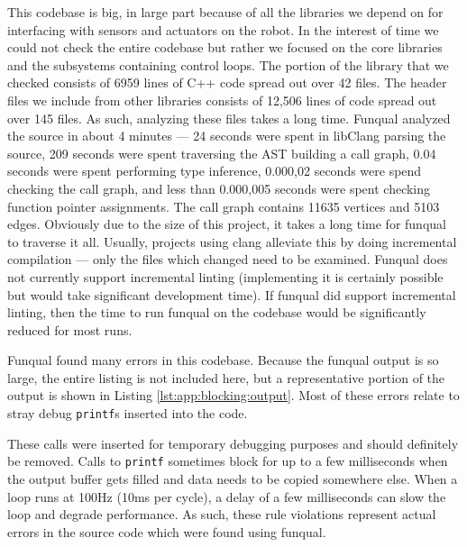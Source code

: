 This codebase is big, in large part because of all the libraries we depend on for interfacing with sensors and actuators on the robot.  In the interest of time we could not check the entire codebase but rather we focused on the core libraries and the subsystems containing control loops.  The portion of the library that we checked consists of 6959 lines of C++ code spread out over 42 files.  The header files we include from other libraries consists of 12,506 lines of code spread out over 145 files.  As such, analyzing these files takes a long time.  Funqual analyzed the source in about 4 minutes --- 24 seconds were spent in libClang parsing the source, 209 seconds were spent traversing the AST building a call graph, 0.04 seconds were spent performing type inference, 0.000,02 seconds were spend checking the call graph, and less than 0.000,005 seconds were spent checking function pointer assignments.  The call graph contains 11635 vertices and 5103 edges.  Obviously due to the size of this project, it takes a long time for funqual to traverse it all.  Usually, projects using clang alleviate this by doing incremental compilation --- only the files which changed need to be examined.  Funqual does not currently support incremental linting (implementing it is certainly possible but would take significant development time).  If funqual did support incremental linting, then the time to run funqual on the codebase would be significantly reduced for most runs.  

Funqual found many errors in this codebase.  Because the funqual output is so large, the entire listing is not included here, but a representative portion of the output is shown in Listing \ref{lst:app:blocking:output}.  Most of these errors relate to stray debug \lstinline{printf}s inserted into the code.  

These calls were inserted for temporary debugging purposes and should definitely be removed.  Calls to \lstinline{printf} sometimes block for up to a few milliseconds when the output buffer gets filled and data needs to be copied somewhere else.  When a loop runs at 100Hz (10ms per cycle), a delay of a few milliseconds can slow the loop and degrade performance.  As such, these rule violations represent actual errors in the source code which were found using funqual.  

